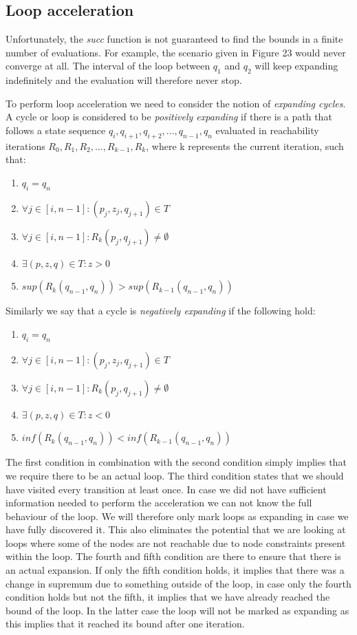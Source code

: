 \documentclass[12pt]{thesis}
\begin{document}
\subsection{Loop acceleration}
\label{sec:accel}
Unfortunately, the \textit{succ} function is not guaranteed to find the bounds in a finite number of evaluations. For example, the scenario given in Figure 23 would never converge at all. The interval of the loop between $q_1$ and $q_2$ will keep expanding indefinitely and the evaluation will therefore never stop.

To perform loop acceleration we need to consider the notion of \textit{expanding cycles}. A cycle or loop is considered to be \textit{positively expanding} if there is a path that follows a state sequence $q_i, q_{i+1}, q_{i+2}, ..., q_{n-1}, q_n$ evaluated in reachability iterations $R_0, R_{1}, R_{2}, ..., R_{k-1}, R_{k}$, where k represents the current iteration, such that:
\begin{enumerate}
	\item $q_i = q_n$
	\item $\forall j \in [i, n-1]: (p_j, z_j, q_{j+1}) \in T$
	\item $\forall j \in [i, n-1]: R_k(p_j, q_{j+1}) \ne \emptyset$
	\item $\exists (p, z, q) \in T: z > 0$
	\item $sup(R_k(q_{n-1}, q_{n})) > sup(R_{k-1}(q_{n-1}, q_n))$
\end{enumerate}

Similarly we say that a cycle is \textit{negatively expanding} if the following hold:
\begin{enumerate}
	\item $q_i = q_n$
	\item $\forall j \in [i, n-1] : (p_j, z_j, q_{j+1}) \in T$
	\item $\forall j \in [i, n-1]: R_k(p_j, q_{j+1}) \ne \emptyset$
	\item $\exists (p, z, q) \in T: z < 0$
	\item $inf(R_k(q_{n-1}, q_{n})) < inf(R_{k-1}(q_{n-1}, q_n))$
\end{enumerate}

The first condition in combination with the second condition simply implies that we require there to be an actual loop. The third condition states that we should have visited every transition at least once. In case we did not have sufficient information needed to perform the acceleration we can not know the full behaviour of the loop. We will therefore only mark loops as expanding in case we have fully discovered it. This also eliminates the potential that we are looking at loops where some of the nodes are not reachable due to node constraints present within the loop. The fourth and fifth condition are there to ensure that there is an actual expansion. If only the fifth condition holds, it implies that there was a change in supremum due to something outside of the loop, in case only the fourth condition holds but not the fifth, it implies that we have already reached the bound of the loop. In the latter case the loop will not be marked as expanding as this implies that it reached its bound after one iteration.
\end{document}
